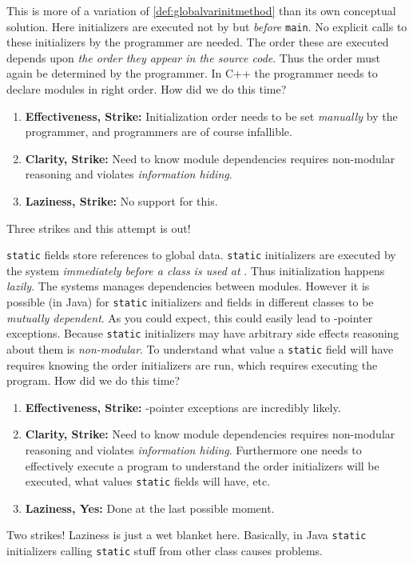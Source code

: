 \documentclass{article}
\begin{document}
\begin{example}[C++ Initializers]
  This is more of a variation of \ref{def:globalvarinitmethod} than its own conceptual solution.
  Here initializers are executed not by but \textit{before} \texttt{main}.
  No explicit calls to these initializers by the programmer are needed.
  The order these are executed depends upon \textit{the order they appear in the source code}.
  Thus the order must again be determined by the programmer.
  In C++ the programmer needs to declare modules in right order.
  How did we do this time?
  \begin{enumerate}
  \item \textbf{Effectiveness, Strike:} Initialization order needs to be set \textit{manually} by the programmer, and programmers are of course infallible.
  \item \textbf{Clarity, Strike:} Need to know module dependencies requires non-modular reasoning and violates \textit{information hiding}.
  \item \textbf{Laziness, Strike:} No support for this.
  \end{enumerate}
  Three strikes and this attempt is out!
\end{example}

\begin{definition}\label{def:staticinit}
  \texttt{static} fields store references to global data.
  \texttt{static} initializers are executed by the system \textit{immediately before a class is used at \runtime{}}.
  Thus initialization happens \textit{lazily}.
  The \runtime{} systems manages dependencies between modules.
  However it is possible (in Java) for \texttt{static} initializers and fields in different classes to be \textit{mutually dependent}.
  As you could expect, this could easily lead to \cringe{}-pointer exceptions.
  Because \texttt{static} initializers may have arbitrary side effects reasoning about them is \textit{non-modular}.
  To understand what value a \texttt{static} field will have requires knowing the order initializers are run, which requires executing the program.
  How did we do this time?
  \begin{enumerate}
  \item \textbf{Effectiveness, Strike:} \cringe{}-pointer exceptions are incredibly likely.
  \item \textbf{Clarity, Strike:} Need to know module dependencies requires non-modular reasoning and violates \textit{information hiding}.
    Furthermore one needs to effectively execute a program to understand the order initializers will be executed, what values \texttt{static} fields will have, etc.
  \item \textbf{Laziness, Yes:} Done at the last possible moment.
  \end{enumerate}
  Two strikes! Laziness is just a wet blanket here.
  Basically, in Java \texttt{static} initializers calling \texttt{static} stuff from other class causes problems.
\end{definition}
\end{document}
